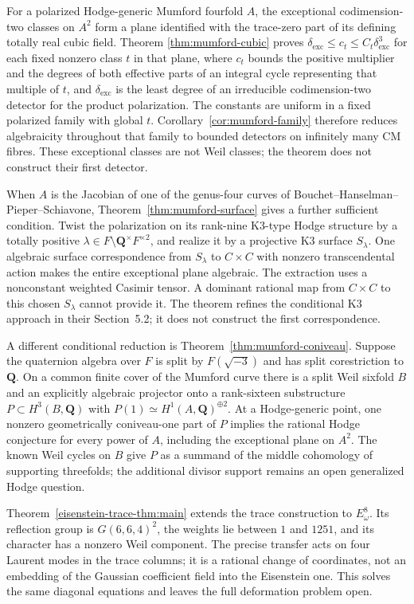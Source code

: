 \documentclass[11pt]{article}
\theoremstyle{definition}
\theoremstyle{remark}
\newcommand{\Q}{\mathbf Q}
\begin{document}
For a polarized Hodge-generic Mumford fourfold $A$, the exceptional
codimension-two classes on $A^2$ form a plane identified with the
trace-zero part of its defining totally real cubic field. Theorem
\ref{thm:mumford-cubic} proves
$\delta_{\mathrm{exc}}\leq c_t\leq C_t\delta_{\mathrm{exc}}^3$
for each fixed nonzero class $t$ in that plane, where $c_t$ bounds the positive multiplier and the degrees of both
effective parts of an integral cycle representing that multiple of $t$, and
$\delta_{\mathrm{exc}}$ is the least degree of an irreducible
codimension-two detector for the product polarization. The constants
are uniform in a fixed polarized family with global $t$.
Corollary~\ref{cor:mumford-family} therefore reduces algebraicity
throughout that family to bounded detectors on infinitely many CM
fibres. These exceptional classes are not Weil classes; the theorem
does not construct their first detector.

When $A$ is the Jacobian of one of the genus-four curves of Bouchet--Hanselman--Pieper--Schiavone, Theorem~\ref{thm:mumford-surface} gives a further sufficient condition. Twist the polarization on its rank-nine K3-type Hodge structure by a totally positive $\lambda\in F\setminus\Q^\times F^{\times2}$, and realize it by a projective K3 surface $S_\lambda$. One algebraic surface correspondence from $S_\lambda$ to $C\times C$ with nonzero transcendental action makes the entire exceptional plane algebraic. The extraction uses a nonconstant weighted Casimir tensor. A dominant rational map from $C\times C$ to this chosen $S_\lambda$ cannot provide it. The theorem refines the conditional K3 approach in their Section~5.2; it does not construct the first correspondence.

A different conditional reduction is Theorem~\ref{thm:mumford-coniveau}. Suppose the quaternion algebra over $F$ is split by $F(\sqrt{-3})$ and has split corestriction to $\Q$. On a common finite cover of the Mumford curve there is a split Weil sixfold $B$ and an explicitly algebraic projector onto a rank-sixteen substructure $P\subset H^3(B,\Q)$ with $P(1)\simeq H^1(A,\Q)^{\oplus2}$. At a Hodge-generic point, one nonzero geometrically coniveau-one part of $P$ implies the rational Hodge conjecture for every power of $A$, including the exceptional plane on $A^2$. The known Weil cycles on $B$ give $P$ as a summand of the middle cohomology of supporting threefolds; the additional divisor support remains an open generalized Hodge question.


Theorem~\ref{eisenstein-trace-thm:main} extends the trace construction
to $E_\omega^8$. Its reflection group is
$G(6,6,4)^2$, the weights lie between $1$ and $1251$, and its
character has a nonzero Weil component. The precise transfer acts on
four Laurent modes in the trace columns; it is a rational change of
coordinates, not an embedding of the Gaussian coefficient field into
the Eisenstein one. This solves the same diagonal equations and
leaves the full deformation problem open.
\end{document}
